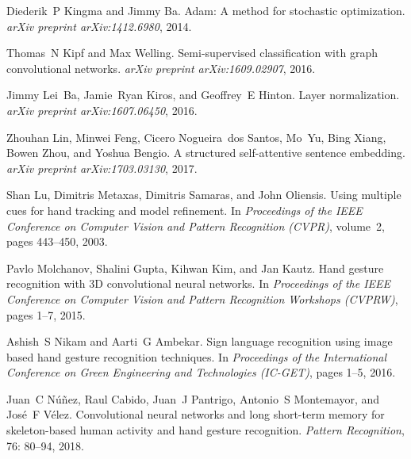 \documentclass{bmvc2k}
\begin{document}
\begin{thebibliography}{42}
Diederik~P Kingma and Jimmy Ba.
\newblock Adam: A method for stochastic optimization.
\newblock \emph{arXiv preprint arXiv:1412.6980}, 2014.

Thomas~N Kipf and Max Welling.
\newblock Semi-supervised classification with graph convolutional networks.
\newblock \emph{arXiv preprint arXiv:1609.02907}, 2016.

Jimmy Lei~Ba, Jamie~Ryan Kiros, and Geoffrey~E Hinton.
\newblock Layer normalization.
\newblock \emph{arXiv preprint arXiv:1607.06450}, 2016.

Zhouhan Lin, Minwei Feng, Cicero Nogueira~dos Santos, Mo~Yu, Bing Xiang, Bowen
  Zhou, and Yoshua Bengio.
\newblock A structured self-attentive sentence embedding.
\newblock \emph{arXiv preprint arXiv:1703.03130}, 2017.

Shan Lu, Dimitris Metaxas, Dimitris Samaras, and John Oliensis.
\newblock Using multiple cues for hand tracking and model refinement.
\newblock In \emph{Proceedings of the IEEE Conference on Computer Vision and
  Pattern Recognition (CVPR)}, volume~2, pages 443--450, 2003.

Pavlo Molchanov, Shalini Gupta, Kihwan Kim, and Jan Kautz.
\newblock Hand gesture recognition with {3D} convolutional neural networks.
\newblock In \emph{Proceedings of the IEEE Conference on Computer Vision and
  Pattern Recognition Workshops (CVPRW)}, pages 1--7, 2015.

Ashish~S Nikam and Aarti~G Ambekar.
\newblock Sign language recognition using image based hand gesture recognition
  techniques.
\newblock In \emph{Proceedings of the International Conference on Green
  Engineering and Technologies (IC-GET)}, pages 1--5, 2016.

Juan~C N{\'u}{\~n}ez, Raul Cabido, Juan~J Pantrigo, Antonio~S Montemayor, and
  Jos{\'e}~F V{\'e}lez.
\newblock Convolutional neural networks and long short-term memory for
  skeleton-based human activity and hand gesture recognition.
\newblock \emph{Pattern Recognition}, 76: 80--94, 2018.


\end{thebibliography}
\end{document}
